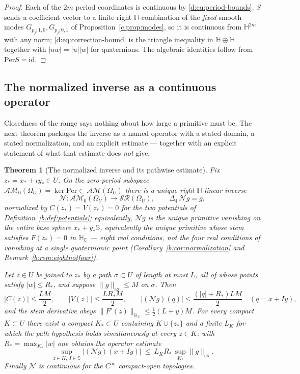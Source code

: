 \documentclass[11pt,a4paper]{article}
\numberwithin{equation}{section}
\newtheorem{theorem}{Theorem}[section]
\theoremstyle{definition}
\theoremstyle{remark}
\theoremstyle{plain}
\newcommand{\HH}{\mathbb H}
\newcommand{\HC}{\mathbb H_{\mathbb C}}
\newcommand{\SSS}{\mathbb S}
\newcommand{\lap}{\Delta_4}
\newcommand{\SR}{\mathcal{SR}}
\newcommand{\AM}{\mathcal{AM}}
\newcommand{\Om}{\Omega}
\newcommand{\Per}{\mathrm{Per}}
\newcommand{\pot}{C}          %
\newcommand{\potV}{V}         %
\newcommand{\axn}[1]{\lVert #1\rVert_{\mathrm{ax}}}   %
\newcommand{\abs}[1]{\lvert #1\rvert}
\newcommand{\norm}[1]{\lVert #1\rVert}
\begin{document}
\begin{proof}
Each of the $2m$ period coordinates is continuous by
\eqref{d:eq:period-bounds}.  $S$ sends a coefficient vector to a finite
right $\HH$-combination of the \emph{fixed} smooth modes
$G_{p_j;1,0},G_{p_j;0,1}$ of Proposition~\ref{c:prop:modes}, so it is continuous from $\HH^{2m}$
with any norm; \eqref{d:eq:correction-bound} is the triangle inequality in
$\HH\oplus\HH$ together with $\abs{uw}=\abs u\abs w$ for quaternions.  The
algebraic identities follow from $\Per S=\mathrm{id}$.
\end{proof}

\subsection{The normalized inverse as a continuous operator}

Closedness of the range says nothing about how large a primitive must be.
The next theorem packages the inverse as a named operator with a stated
domain, a stated normalization, and an explicit estimate --- together with
an explicit statement of what that estimate does \emph{not} give.

\begin{theorem}[The normalized inverse and its pathwise estimate]
\label{d:thm:normalized-inverse}
Fix $z_*=x_*+\iota y_*\in U$.  On the zero-period subspace
$\AM_0(\Om_U)=\ker\Per\subset\AM(\Om_U)$ there is a unique right
$\HH$-linear inverse
\[
 \mathcal N:\AM_0(\Om_U)\longrightarrow\SR(\Om_U),
 \qquad \lap\,\mathcal N g=g,
\]
normalized by $\pot(z_*)=\potV(z_*)=0$ for the two potentials of
Definition~\ref{b:def:potentials};
equivalently, $\mathcal N g$ is the unique primitive vanishing on the
entire base sphere $x_*+y_*\SSS$, equivalently the unique primitive whose
stem satisfies $F(z_*)=0$ in $\HC$ --- eight real conditions, not the four
real conditions of vanishing at a single quaternionic point
(Corollary~\ref{b:cor:normalization} and Remark~\ref{b:rem:eightnotfour}).

Let $z\in U$ be joined to $z_*$ by a path $\sigma\subset U$ of length at
most $L$, all of whose points satisfy $\abs w\le R_*$, and suppose
$\axn g\le M$ on $\sigma$.  Then
\begin{equation}
 \abs{\pot(z)}\le\frac{LM}{2},
 \qquad
 \abs{\potV(z)}\le\frac{LR_*M}{2},
 \qquad
 \abs{(\mathcal N g)(q)}\le\frac{(\abs q+R_*)LM}{2}
 \quad (q=x+Iy),
 \label{d:eq:inverse-bound}
\end{equation}
and the stem derivative obeys
$\norm{F'(z)}_{\HC}\le\tfrac12(L+y)M$.
For every compact $K\subset U$ there exist a compact $K_*\subset U$
containing $K\cup\{z_*\}$ and a finite $L_K$ for which the path hypothesis
holds simultaneously at every $z\in K$; with
$R_*=\max_{K_*}\abs w$ one obtains the operator estimate
\begin{equation}
 \sup_{z\in K,\ I\in\SSS}\abs{(\mathcal N g)(x+Iy)}
 \ \le\ L_K R_*\,\sup_{K_*}\axn g .
 \label{d:eq:operator-estimate}
\end{equation}
Finally $\mathcal N$ is continuous for the $C^\infty$ compact-open
topologies.
\end{theorem}
\end{document}
